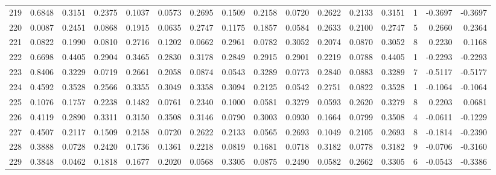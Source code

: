 \begin{tabular}{lrrrrrrrrrrrrrrr}
219 &      0.6848 &  0.3151 &  0.2375 &  0.1037 &  0.0573 &  0.2695 &  0.1509 &  0.2158 &  0.0720 &  0.2622 &   0.2133 &     0.3151 &      1 &                   -0.3697 &                    -0.3697 \\
220 &      0.0087 &  0.2451 &  0.0868 &  0.1915 &  0.0635 &  0.2747 &  0.1175 &  0.1857 &  0.0584 &  0.2633 &   0.2100 &     0.2747 &      5 &                    0.2660 &                     0.2364 \\
221 &      0.0822 &  0.1990 &  0.0810 &  0.2716 &  0.1202 &  0.0662 &  0.2961 &  0.0782 &  0.3052 &  0.2074 &   0.0870 &     0.3052 &      8 &                    0.2230 &                     0.1168 \\
222 &      0.6698 &  0.4405 &  0.2904 &  0.3465 &  0.2830 &  0.3178 &  0.2849 &  0.2915 &  0.2901 &  0.2219 &   0.0788 &     0.4405 &      1 &                   -0.2293 &                    -0.2293 \\
223 &      0.8406 &  0.3229 &  0.0719 &  0.2661 &  0.2058 &  0.0874 &  0.0543 &  0.3289 &  0.0773 &  0.2840 &   0.0883 &     0.3289 &      7 &                   -0.5117 &                    -0.5177 \\
224 &      0.4592 &  0.3528 &  0.2566 &  0.3355 &  0.3049 &  0.3358 &  0.3094 &  0.2125 &  0.0542 &  0.2751 &   0.0822 &     0.3528 &      1 &                   -0.1064 &                    -0.1064 \\
225 &      0.1076 &  0.1757 &  0.2238 &  0.1482 &  0.0761 &  0.2340 &  0.1000 &  0.0581 &  0.3279 &  0.0593 &   0.2620 &     0.3279 &      8 &                    0.2203 &                     0.0681 \\
226 &      0.4119 &  0.2890 &  0.3311 &  0.3150 &  0.3508 &  0.3146 &  0.0790 &  0.3003 &  0.0930 &  0.1664 &   0.0799 &     0.3508 &      4 &                   -0.0611 &                    -0.1229 \\
227 &      0.4507 &  0.2117 &  0.1509 &  0.2158 &  0.0720 &  0.2622 &  0.2133 &  0.0565 &  0.2693 &  0.1049 &   0.2105 &     0.2693 &      8 &                   -0.1814 &                    -0.2390 \\
228 &      0.3888 &  0.0728 &  0.2420 &  0.1736 &  0.1361 &  0.2218 &  0.0819 &  0.1681 &  0.0718 &  0.3182 &   0.0778 &     0.3182 &      9 &                   -0.0706 &                    -0.3160 \\
229 &      0.3848 &  0.0462 &  0.1818 &  0.1677 &  0.2020 &  0.0568 &  0.3305 &  0.0875 &  0.2490 &  0.0582 &   0.2662 &     0.3305 &      6 &                   -0.0543 &                    -0.3386 \\

\end{tabular}
